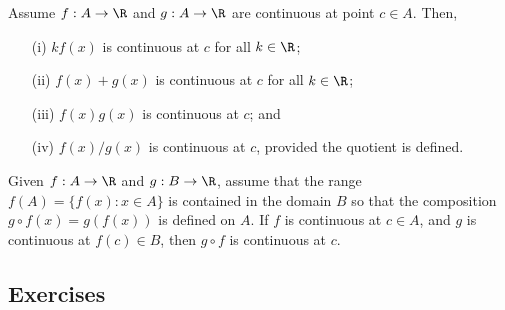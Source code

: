 \begin{tcolorbox}
    \begin{thm} 
    Assume \( f: A \to \R  \) and \( g: A \to \R  \) are continuous at point \( c \in A  \). Then, 
    \begin{enumerate}
        \item[(i)] \( kf(x)  \) is continuous at \( c  \) for all \( k \in \R  \);
        \item[(ii)] \( f(x) + g(x) \) is continuous at \( c  \) for all \( k \in \R  \);
        \item[(iii)] \( f(x) g(x) \) is continuous at \( c  \); and 
        \item[(iv)] \( f(x) / g(x)  \) is continuous at \( c  \), provided the quotient is defined.
    \end{enumerate}
    \end{thm}
\end{tcolorbox}

\begin{tcolorbox}
    \begin{thm}
    Given \( f: A \to \R  \) and \( g: B \to \R  \), assume that the range \( f(A) = \{ f(x) : x \in A  \}  \) is contained in the domain \( B  \) so that the composition \( g \circ f(x) = g(f(x)) \) is defined on \( A  \). If \( f \) is continuous at \( c \in A  \), and \( g  \) is continuous at \( f(c) \in B  \), then \( g \circ f  \) is continuous at \( c  \).

    \end{thm}
\end{tcolorbox}

\subsection{Exercises}


